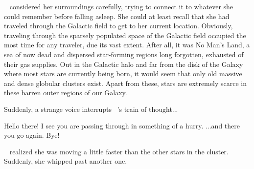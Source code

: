 \documentclass[main.tex]{subfiles}
\begin{document}
\par \nar \rmsterope~ considered her surroundings carefully, trying to connect it to whatever she could remember before falling asleep.  She could at least recall that she had traveled through the Galactic field to get to her current location.  Obviously, traveling through the sparsely populated space of the Galactic field occupied the most time for any traveler, due its vast extent.  After all, it was No Man's Land, a sea of now dead and dispersed star-forming regions long forgotten, exhausted of their gas supplies.  Out in the Galactic halo and far from the disk of the Galaxy where most stars are currently being born, it would seem that only old massive and dense globular clusters exist.  Apart from these, stars are extremely scarce in these barren outer regions of our Galaxy. 


\par \nar Suddenly, a strange voice interrupts \rmsterope~'s train of thought...

\par \Jane Hello there!  I see you are passing through in something of a hurry.  ...and there you go again.  Bye!

\par \nar \rmsterope~ realized she was moving a little faster than the other stars in the cluster.  Suddenly, she whipped past another one.
\end{document}
